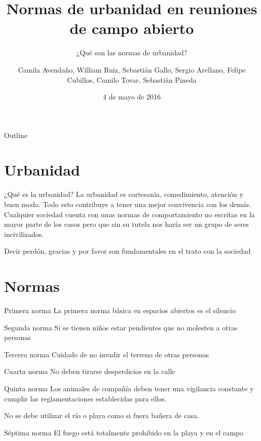 \documentclass{beamer}
\title[] %
{Normas de urbanidad en reuniones de campo abierto}
\subtitle
{¿Qué son las normas de urbanidad?} %
\author[Arellano, Avendaño, Cubillos, Gallo, Pineda, Ruíz, Tovar] %
{Camila Avendaño, William Ruiz, Sebastián Gallo, Sergio Arellano, Felipe Cubillos, Camilo Tovar, Sebastián Pineda}
\institute[Gabriel Bentacourt] %
{
 \inst{Colegio Gabriel Betancourt Mejía}%
 Ética\\
 }
\date[] %
{4 de mayo de 2016}
\begin{document}
\begin{frame}
  \titlepage
\end{frame}

\begin{frame}{Outline}
  \tableofcontents
\end{frame}




\section{Urbanidad}

\begin{frame}{¿Qué es la urbanidad?}%
La urbanidad es cortesanía, comedimiento, atención y buen modo. Todo esto contribuye a tener una mejor convivencia con los demás. Cualquier sociedad cuenta con unas normas de comportamiento no escritas en la mayor parte de los casos pero que sin su tutela nos haría ser un grupo de seres incivilizados.
\end{frame}

\begin{frame}{}
Decir perdón, gracias y por favor son fundamentales en el trato con la sociedad
\end{frame}
\section{Normas}
\begin{frame}{Primera norma}
La primera norma básica en espacios abiertos es el silencio
\end{frame}
\begin{frame}{Segunda norma}
Si se tienen niños estar pendientes que no molesten a otras personas
\end{frame}
\begin{frame}{Tercera norma}
Cuidado de no invadir el terreno de otras personas
\end{frame}
\begin{frame}{Cuarta norma}
No deben tirarse desperdicios en la calle
\end{frame}
\begin{frame}{Quinta norma}
Los animales de compañía deben tener una vigilancia constante y cumplir las reglamentaciones establecidas para ellos.
\end{frame}
\begin{frame}
No se debe utilizar el río o playa como si fuera bañera de casa.
\end{frame}

\begin{frame}{Séptima norma}
El fuego está totalmente prohibido en la playa y en el campo
\end{frame}
\end{document}
